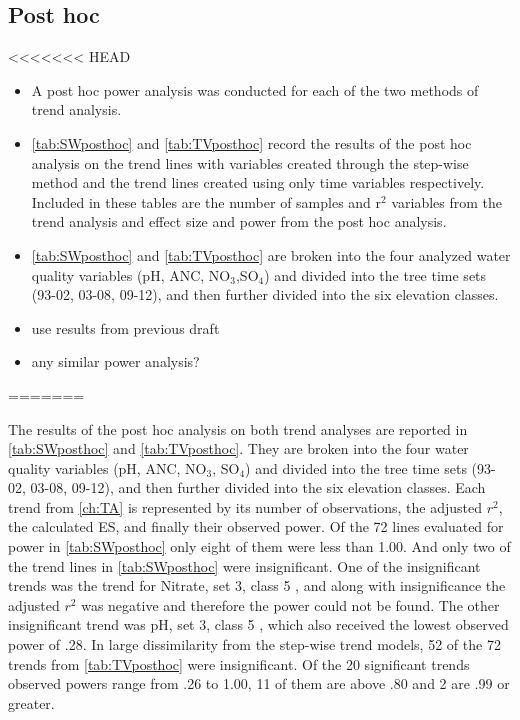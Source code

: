 \subsection{Post hoc}
<<<<<<< HEAD
\begin{itemize}
	\item A post hoc power analysis was conducted for each of the two methods of trend analysis.
	\item \autoref{tab:SWposthoc} and \autoref{tab:TVposthoc} record the results of the post hoc analysis on the trend lines with variables created through the step-wise method and the trend lines created using only time variables respectively.  Included in these tables are the number of samples and r$^2$ variables from the trend analysis and effect size and power from the post hoc analysis.
	\item \autoref{tab:SWposthoc} and \autoref{tab:TVposthoc} are broken into the four analyzed water quality variables (pH, ANC, NO$_3$,SO$_4$) and divided into the tree time sets (93-02, 03-08, 09-12), and then further divided into the six elevation classes.
	\item use results from previous draft
	\item any similar power analysis?
\end{itemize}
=======

The results of the post hoc analysis on both trend analyses are reported in  \autoref{tab:SWposthoc} and \autoref{tab:TVposthoc}.
They are broken into the four water quality variables (pH, ANC, NO$_3$, SO$_4$) and divided into the tree time sets (93-02, 03-08, 09-12), and then further divided into the six elevation classes.
Each trend from \autoref{ch:TA} is represented by its number of observations, the adjusted $r^2$, the calculated ES, and finally their observed power.
Of the 72 lines evaluated for power in \autoref{tab:SWposthoc} only eight of them were less than 1.00.
And only two of the trend lines in \autoref{tab:SWposthoc} were insignificant.
One of the insignificant trends was the trend for Nitrate, set 3, class 5 , and along with insignificance the adjusted $r^2$ was negative and therefore the power could not be found.
The other insignificant trend was pH, set 3, class 5 , which also received the lowest observed power of .28.
In large dissimilarity from the step-wise trend models, 52 of the 72 trends from \autoref{tab:TVposthoc} were insignificant.
Of the 20 significant trends observed powers range from .26 to 1.00, 11 of them are above .80 and 2 are .99 or greater.

